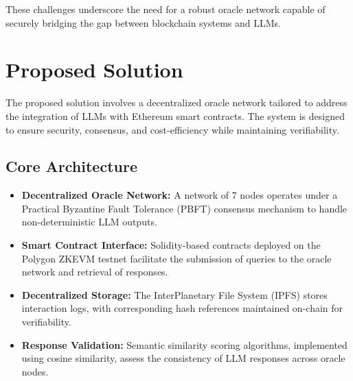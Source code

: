 \documentclass[12pt]{article}
\begin{document}
These challenges underscore the need for a robust oracle network capable of securely bridging the gap between blockchain systems and LLMs.

\section{Proposed Solution}
The proposed solution involves a decentralized oracle network tailored to address the integration of LLMs with Ethereum smart contracts. The system is designed to ensure security, consensus, and cost-efficiency while maintaining verifiability.

\subsection{Core Architecture}
\begin{itemize}
    \item \textbf{Decentralized Oracle Network:} A network of 7 nodes operates under a Practical Byzantine Fault Tolerance (PBFT) consensus mechanism to handle non-deterministic LLM outputs.
    \item \textbf{Smart Contract Interface:} Solidity-based contracts deployed on the Polygon ZKEVM testnet facilitate the submission of queries to the oracle network and retrieval of responses.
    \item \textbf{Decentralized Storage:} The InterPlanetary File System (IPFS) stores interaction logs, with corresponding hash references maintained on-chain for verifiability.
    \item \textbf{Response Validation:} Semantic similarity scoring algorithms, implemented using cosine similarity, assess the consistency of LLM responses across oracle nodes.
\end{itemize}
\end{document}
